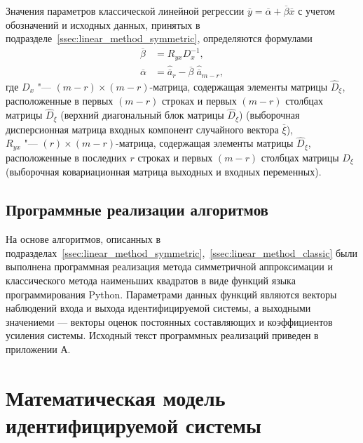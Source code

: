 Значения параметров классической линейной регрессии
\( \overline{y} = \overline{\alpha} + \overline{\beta} \overline{x} \)
с учетом обозначений и исходных данных, принятых в подразделе~\ref{ssec:linear_method_symmetric},
определяются формулами
\begin{equation*}
  \begin{aligned}
    \overline{\beta} &= R_{yx} D^{-1}_{x}, \\
    \overline{\alpha} &= \hat{\overline{a}}_{r} - \overline{\beta} \; \hat{\overline{a}}_{m-r},
  \end{aligned}
\end{equation*}
где \( D_x \) "--- \( (m-r) \times (m-r) \)-матрица, содержащая элементы матрицы \( \hat{D}_{\xi} \),
расположенные в первых \( (m-r) \) строках и первых \( (m-r) \) столбцах матрицы \( \hat{D}_{\xi} \)
(верхний диагональный блок матрицы \( \hat{D}_{\xi} \))
(выборочная дисперсионная матрица входных компонент случайного вектора \( \overline{\xi} \)), \\
\hspace*{7mm} \( R_{yx} \) "--- \( (r) \times (m-r) \)-матрица, содержащая элементы матрицы
\( \hat{D}_{\xi} \), расположенные в последних \( r \) строках и первых \( (m-r) \) столбцах
матрицы \( D_{\xi} \) (выборочная ковариационная матрица выходных и входных переменных).

\subsection{Программные реализации алгоритмов}

На основе алгоритмов, описанных в
подразделах~\ref{ssec:linear_method_symmetric},~\ref{ssec:linear_method_classic}
были выполнена программная реализация метода симметричной аппроксимации и
классического метода наименьших квадратов в виде функций
языка программирования Python.
Параметрами данных функций являются векторы наблюдений входа и выхода
идентифицируемой системы, а выходными значениеми ---
векторы оценок постоянных составляющих и коэффициентов усиления системы.
Исходный текст программных реализаций приведен в приложении А.

\section{Математическая модель идентифицируемой системы}

